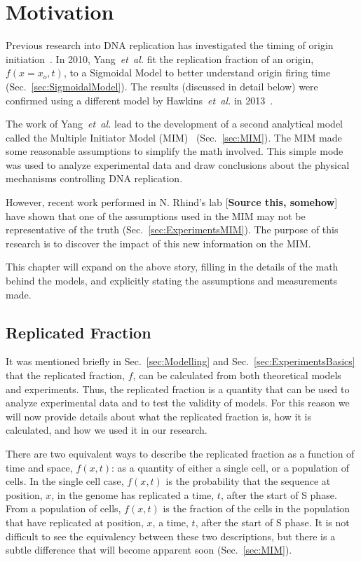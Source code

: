 \chapter{Motivation}
\label{ch:Motivation}

Previous research into DNA replication has investigated the timing of origin initiation~\cite{ScottsPaper,Bechhoefer2012374,deMouraModel1,deMouraModel2,StochasticTermination}.
In 2010, Yang~\emph{et~al.} fit the replication fraction of an origin, $f(x=x_o,t)$, to a Sigmoidal Model to better understand origin firing time~\cite{ScottsPaper} (Sec.~\ref{sec:SigmoidalModel}).
The results (discussed in detail below) were confirmed using a different model by Hawkins~\emph{et~al.} in 2013~\cite{StochasticTermination}.

The work of Yang~\emph{et~al.} lead to the development of a second analytical model called the Multiple Initiator Model (MIM)~\cite{ScottsPaper} (Sec.~\ref{sec:MIM}).
The MIM made some reasonable assumptions to simplify the math involved.
This simple mode was used to analyze experimental data and draw conclusions about the physical mechanisms controlling DNA replication.

However, recent work performed in N. Rhind's lab [\textbf{Source this, somehow}] have shown that one of the assumptions used in the MIM may not be representative of the truth (Sec.~\ref{sec:ExperimentsMIM}).
The purpose of this research is to discover the impact of this new information on the MIM.

This chapter will expand on the above story, filling in the details of the math behind the models, and explicitly stating the assumptions and measurements made.


	\section{Replicated Fraction}
	\label{sec:ReplicatedFraction}
	
	It was mentioned briefly in Sec.~\ref{sec:Modelling} and Sec.~\ref{sec:ExperimentsBasics} that the replicated fraction, $f$, can be calculated from both theoretical models and experiments.
	Thus, the replicated fraction is a quantity that can be used to analyze experimental data and to test the validity of models.
	For this reason we will now provide details about what the replicated fraction is, how it is calculated, and how we used it in our research.
	
	There are two equivalent ways to describe the replicated fraction as a function of time and space, $f(x,t)$:
	as a quantity of either a single cell, or a population of cells.
	In the single cell case, $f(x,t)$ is the probability that the sequence at position, $x$, in the genome has replicated a time, $t$, after the start of S phase.
	From a population of cells, $f(x,t)$ is the fraction of the cells in the population that have replicated at position, $x$, a time, $t$, after the start of S phase.
	It is not difficult to see the equivalency between these two descriptions, but there is a subtle difference that will become apparent soon (Sec.~\ref{sec:MIM}).
	

